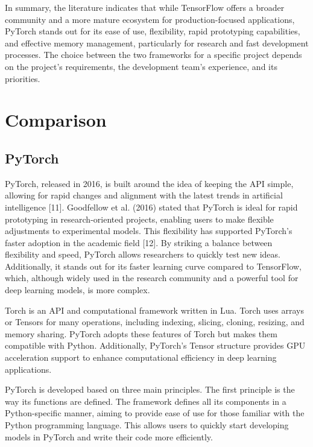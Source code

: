 \documentclass[conference]{IEEEtran}
\begin{document}
In summary, the literature indicates that while TensorFlow offers a broader community and a more mature ecosystem for production-focused applications, PyTorch stands out for its ease of use, flexibility, rapid prototyping capabilities, and effective memory management, particularly for research and fast development processes. The choice between the two frameworks for a specific project depends on the project's requirements, the development team's experience, and its priorities.




\section{Comparison}

\subsection{PyTorch}
PyTorch, released in 2016, is built around the idea of keeping the API simple, allowing for rapid changes and alignment with the latest trends in artificial intelligence [11]. Goodfellow et al. (2016) stated that PyTorch is ideal for rapid prototyping in research-oriented projects, enabling users to make flexible adjustments to experimental models. This flexibility has supported PyTorch’s faster adoption in the academic field [12]. By striking a balance between flexibility and speed, PyTorch allows researchers to quickly test new ideas. Additionally, it stands out for its faster learning curve compared to TensorFlow, which, although widely used in the research community and a powerful tool for deep learning models, is more complex.

Torch is an API and computational framework written in Lua. Torch uses arrays or Tensors for many operations, including indexing, slicing, cloning, resizing, and memory sharing. PyTorch adopts these features of Torch but makes them compatible with Python. Additionally, PyTorch's Tensor structure provides GPU acceleration support to enhance computational efficiency in deep learning applications.

PyTorch is developed based on three main principles. The first principle is the way its functions are defined. The framework defines all its components in a Python-specific manner, aiming to provide ease of use for those familiar with the Python programming language. This allows users to quickly start developing models in PyTorch and write their code more efficiently.
\end{document}

